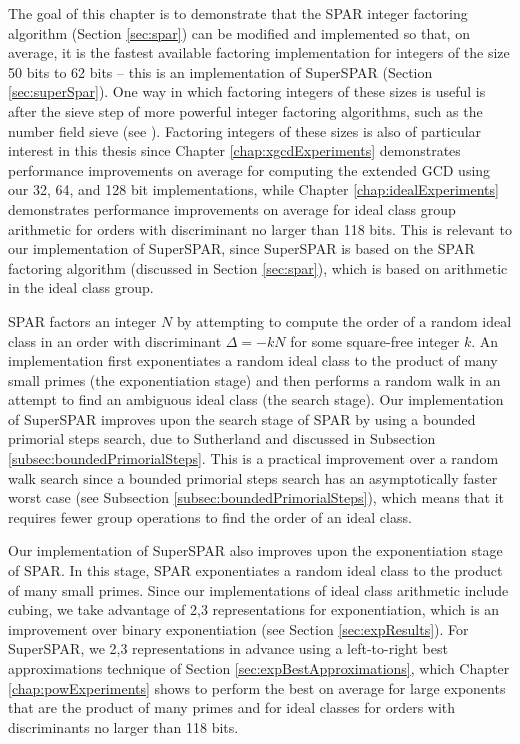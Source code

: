 \documentclass{ucalgthes1}
\theoremstyle{definition}
\begin{document}
The goal of this chapter is to demonstrate that the SPAR integer factoring algorithm (Section \ref{sec:spar}) can be modified and implemented so that, on average, it is the fastest available factoring implementation for integers of the size 50 bits to 62 bits -- this is an implementation of SuperSPAR (Section \ref{sec:superSpar}).  One way in which factoring integers of these sizes is useful is after the sieve step of more powerful integer factoring algorithms, such as the number field sieve (see \cite[\S 6.2]{Crandall2001}).  Factoring integers of these sizes is also of particular interest in this thesis since Chapter \ref{chap:xgcdExperiments} demonstrates performance improvements on average for computing the extended GCD using our 32, 64, and 128 bit implementations, while Chapter \ref{chap:idealExperiments} demonstrates performance improvements on average for ideal class group arithmetic for orders with discriminant no larger than 118 bits.  This is relevant to our implementation of SuperSPAR, since SuperSPAR is based on the SPAR factoring algorithm (discussed in Section \ref{sec:spar}), which is based on arithmetic in the ideal class group.

SPAR factors an integer $N$ by attempting to compute the order of a random ideal class in an order with discriminant $\Delta = -kN$ for some square-free integer $k$.  An implementation first exponentiates a random ideal class to the product of many small primes (the exponentiation stage) and then performs a random walk in an attempt to find an ambiguous ideal class (the search stage).  Our implementation of SuperSPAR improves upon the search stage of SPAR by using a bounded primorial steps search, due to Sutherland \cite{Sutherland2007} and discussed in Subsection \ref{subsec:boundedPrimorialSteps}.  This is a practical improvement over a random walk search since a bounded primorial steps search has an asymptotically faster worst case (see Subsection \ref{subsec:boundedPrimorialSteps}), which means that it requires fewer group operations to find the order of an ideal class.

Our implementation of SuperSPAR also improves upon the exponentiation stage of SPAR.  In this stage, SPAR exponentiates a random ideal class to the product of many small primes.  Since our implementations of ideal class arithmetic include cubing, we take advantage of 2,3 representations for exponentiation, which is an improvement over binary exponentiation (see Section \ref{sec:expResults}).  For SuperSPAR, we 2,3 representations in advance using a left-to-right best approximations technique of Section \ref{sec:expBestApproximations}, which Chapter \ref{chap:powExperiments} shows to perform the best on average for large exponents that are the product of many primes and for ideal classes for orders with discriminants no larger than 118 bits.
\end{document}
